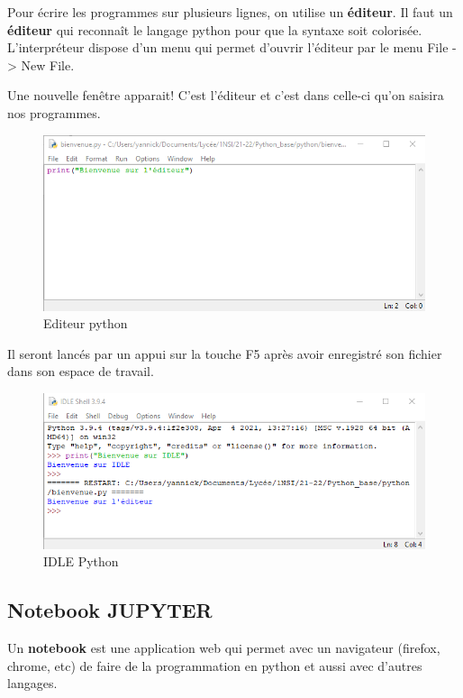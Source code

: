 \documentclass[11pt]{article}
\begin{document}
Pour écrire les programmes sur plusieurs lignes, on utilise un
\textbf{éditeur}. Il faut un \textbf{éditeur} qui reconnaît le langage
python pour que la syntaxe soit colorisée. L'interpréteur dispose d'un
menu qui permet d'ouvrir l'éditeur par le menu File -\textgreater{} New
File.

Une nouvelle fenêtre apparait! C'est l'éditeur et c'est dans celle-ci
qu'on saisira nos programmes.

\begin{figure}
\centering
\includegraphics{img/editeur_python.png}
\caption{Editeur python}
\end{figure}

Il seront lancés par un appui sur la touche F5 après avoir enregistré
son fichier dans son espace de travail.

\begin{figure}
\centering
\includegraphics{img/idle_python2.png}
\caption{IDLE Python}
\end{figure}

    \hypertarget{notebook-jupyter}{%
\subsection{Notebook JUPYTER}\label{notebook-jupyter}}

Un \textbf{notebook} est une application web qui permet avec un
navigateur (firefox, chrome, etc) de faire de la programmation en python
et aussi avec d'autres langages.
\end{document}
